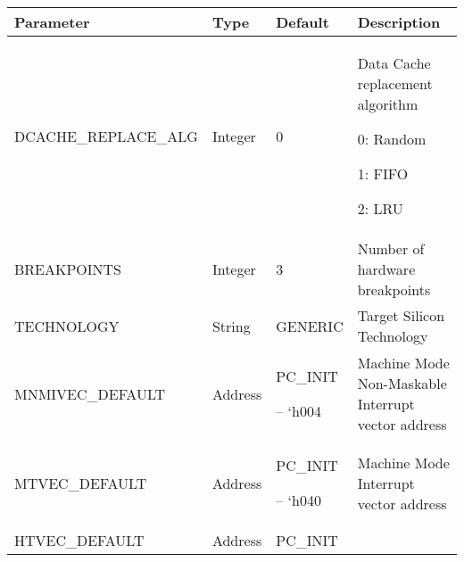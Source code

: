 \protect\hypertarget{_Toc327108315}{}{}

\begin{longtable}[]{@{}llll@{}}
\toprule
Parameter & Type & Default & Description\tabularnewline
\midrule
\endhead
\begin{minipage}[t]{0.24\columnwidth}\raggedright\strut
DCACHE\_REPLACE\_ALG\strut
\end{minipage} & \begin{minipage}[t]{0.24\columnwidth}\raggedright\strut
Integer\strut
\end{minipage} & \begin{minipage}[t]{0.24\columnwidth}\raggedright\strut
0\strut
\end{minipage} & \begin{minipage}[t]{0.24\columnwidth}\raggedright\strut
Data Cache replacement algorithm

0: Random

1: FIFO

2: LRU\strut
\end{minipage}\tabularnewline
BREAKPOINTS & Integer & 3 & Number of hardware
breakpoints\tabularnewline
TECHNOLOGY & String & GENERIC & Target Silicon Technology\tabularnewline
\begin{minipage}[t]{0.24\columnwidth}\raggedright\strut
MNMIVEC\_DEFAULT\strut
\end{minipage} & \begin{minipage}[t]{0.24\columnwidth}\raggedright\strut
Address\strut
\end{minipage} & \begin{minipage}[t]{0.24\columnwidth}\raggedright\strut
PC\_INIT

-- `h004\strut
\end{minipage} & \begin{minipage}[t]{0.24\columnwidth}\raggedright\strut
Machine Mode Non-Maskable Interrupt vector address\strut
\end{minipage}\tabularnewline
\begin{minipage}[t]{0.24\columnwidth}\raggedright\strut
MTVEC\_DEFAULT\strut
\end{minipage} & \begin{minipage}[t]{0.24\columnwidth}\raggedright\strut
Address\strut
\end{minipage} & \begin{minipage}[t]{0.24\columnwidth}\raggedright\strut
PC\_INIT

-- `h040\strut
\end{minipage} & \begin{minipage}[t]{0.24\columnwidth}\raggedright\strut
Machine Mode Interrupt vector address\strut
\end{minipage}\tabularnewline
\begin{minipage}[t]{0.24\columnwidth}\raggedright\strut
HTVEC\_DEFAULT\strut
\end{minipage} & \begin{minipage}[t]{0.24\columnwidth}\raggedright\strut
Address\strut
\end{minipage} & \begin{minipage}[t]{0.24\columnwidth}\raggedright\strut
PC\_INIT


\end{minipage}
\end{longtable}
